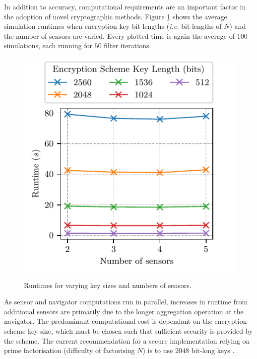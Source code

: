 \documentclass[10pt,letterpaper,oneside,twocolumn,journal]{IEEEtran}
\theoremstyle{definition}
\theoremstyle{definition}
\theoremstyle{remark}
\begin{document}
In addition to accuracy, computational requirements are an important factor in the adoption of novel cryptographic methods. Figure \ref{fig:sim_timing} shows the average simulation runtimes when encryption key bit lengths (\textit{i.e.} bit lengths of $N$) and the number of sensors are varied. Every plotted time is again the average of $100$ simulations, each running for $50$ filter iterations. 
\begin{figure}[htbp]
\centering
\includegraphics{images/timing.pdf}
\caption{Runtimes for varying key sizes and numbers of sensors.}
\label{fig:sim_timing}
\end{figure}
As sensor and navigator computations run in parallel, increases in runtime from additional sensors are primarily due to the longer aggregation operation at the navigator. The predominant computational cost is dependant on the encryption scheme key size, which must be chosen such that sufficient security is provided by the scheme. The current recommendation for a secure implementation relying on prime factorisation (difficulty of factorising $N$) is to use $2048$ bit-long keys \cite{barkerRecommendationPairwiseKey2019}.

% 
%                                               
%                                               
%                                               
% 
\end{document}
